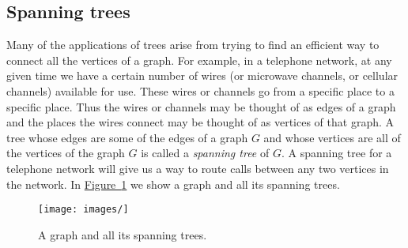 \documentclass[10pt,]{book}
\theoremstyle{plain}
\theoremstyle{definition}
\numberwithin{equation}{chapter}
\begin{document}
\subsection[{Spanning trees}]{Spanning trees}\label{subsection-18}
Many of the applications of trees arise from trying to find an efficient way to connect all the vertices of a graph. For example, in a telephone network, at any given time we have a certain number of wires (or microwave channels, or cellular channels) available for use. These wires or channels go from a specific place to a specific place. Thus the wires or channels may be thought of as edges of a graph and the places the wires connect may be thought of as vertices of that graph. A tree whose edges are some of the edges of a graph \(G\) and whose vertices are all of the vertices of the graph \(G\) is called a \emph{spanning tree} of \(G\). A spanning tree for a telephone network will give us a way to route calls between any two vertices in the network. In \hyperref[spanningtrees]{Figure~\ref{spanningtrees}} we show a graph and all its spanning trees.%
\begin{figure}
\centering
\texttt{[image: images/]}
\caption{A graph and all its spanning trees.\label{spanningtrees}}
\end{figure}
\end{document}
